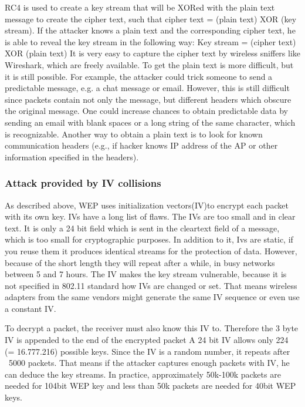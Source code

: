 \documentclass[a4paper,12pt,pagesize,headsepline,bibtotoc,titlepage]{scrartcl}
\begin{document}
RC4 is used to create a key stream that will be XORed with the plain text message to create the cipher text, such that
cipher text = (plain text) XOR (key stream).
If the attacker knows a plain text and the corresponding cipher text, he is able to reveal the key stream in the following way: 
 Key stream = (cipher text) XOR (plain text)
It is very easy to capture the cipher text by wireless sniffers like Wireshark, which are freely available.
To get the plain text is more difficult, but it is still possible. For example, the attacker could trick someone to send a predictable message, e.g. a chat message or email.
However, this is still difficult since packets contain not only the message, but different headers which obscure the original message.
One could increase chances to obtain predictable data by sending an
email with blank spaces or a long string of the same character, which is recognizable. 
Another way to obtain a plain text is to look for known
communication headers (e.g., if hacker knows IP address of the
AP or other information specified in the headers).

\subsubsection{Attack provided by IV collisions}

As described above,  WEP uses initialization vectors(IV)to encrypt each packet
with its own key.
IVs have a long list of flaws.
The IVs are too small and in clear text. 
It is only a 24 bit field which is sent in the cleartext field of a message, which is too small for cryptographic purposes. 
In addition to it, Ivs are static, if you reuse them it produces identical streams for  the protection of data. However, because of the short length they will repeat after a while, in busy networks between 5 and 7 hours.
The IV makes the key stream vulnerable, because it is not specified in 802.11 standard how IVs are changed or set. That means wireless adapters from the same vendors might generate the same IV sequence or even use a constant IV.

To decrypt a packet, the receiver must also know this IV to.
Therefore the 3 byte IV is appended to the end of the encrypted packet
A 24 bit IV allows only 224 (= 16.777.216) possible keys. Since the IV is a random number, it repeats after ~5000 packets.
That means if the attacker captures enough packets with IV, he can deduce the key streams.
In practice, approximately 50k-100k packets are needed for 104bit WEP key and less than 50k packets are needed  for 40bit WEP keys.
\end{document}
